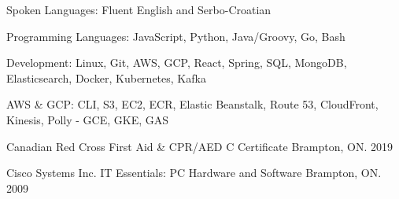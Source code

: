 
\begin{cvhonors}

  \cvhonor
    {Spoken Languages:} %
    {Fluent English and Serbo-Croatian} %
    {} %
    {} %

  \cvhonor
    {Programming Languages:} %
    {JavaScript, Python, Java/Groovy, Go, Bash} %
    {} %
    {} %

  \cvhonor
    {Development:} %
    {Linux, Git, AWS, GCP, React, Spring, SQL, MongoDB, Elasticsearch, Docker, Kubernetes, Kafka} %
    {} %
    {} %

  \cvhonor
    {AWS \& GCP:} %
    {CLI, S3, EC2, ECR, Elastic Beanstalk, Route 53, CloudFront, Kinesis, Polly - GCE, GKE, GAS} %
    {} %
    {} %


  \cvhonor
    {Canadian Red Cross} %
    {First Aid \& CPR/AED C Certificate} %
    {Brampton, ON.} %
    {2019} %


  \cvhonor
    {Cisco Systems Inc.} %
    {IT Essentials: PC Hardware and Software} %
    {Brampton, ON.} %
    {2009} %

\end{cvhonors}